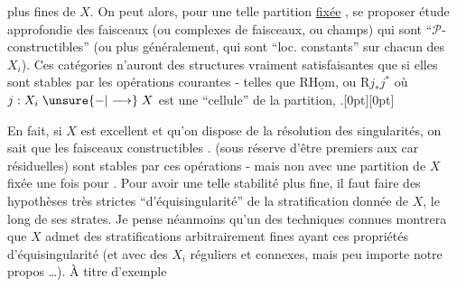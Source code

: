 %
plus fines de $X$. On peut alors, pour une telle partition \uline{fixée} , se proposer  étude approfondie  des faisceaux (ou complexes de faisceaux, ou champs) qui sont ``$\mathcal P$-constructibles'' (ou plus généralement, qui sont ``loc. constants'' sur chacun des $X_i$). Ces catégories n'auront des structures vraiment  satisfaisantes que si elles sont stables par les opérations courantes - telles que $\mathrm R\underline{\mathrm{Hom}}$, ou $\mathrm Rj_*j^*$ où $j:X_i\mathrel{\unsure{-|\longrightarrow}}X$ est une ``cellule'' de la partition, .\raisebox{0.35ex}[0pt][0pt]{\parbox[c][0pt][c]{0pt}{}} En fait, si $X$ est excellent et qu'on dispose de la résolution des singularités, on sait que les faisceaux  constructibles . (sous réserve d'être premiers aux car résiduelles) sont stables par  ces opérations - mais non avec une partition de $X$ fixée une fois pour . Pour avoir une telle stabilité plus fine, il faut faire des hypothèses très strictes  ``d'équisingularité'' de la stratification donnée de $X$, le long de ses strates. Je pense néanmoins qu'un  des techniques connues montrera que $X$ admet des stratifications arbitrairement fines ayant ces propriétés d'équisingularité (et avec des $X_i$ réguliers et connexes, mais peu importe  notre propos \ldots). À titre d'exemple
